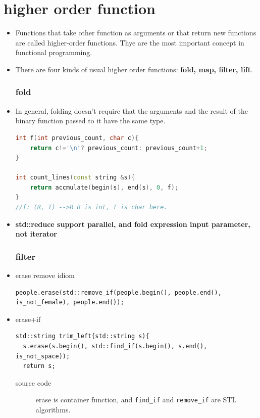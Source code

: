 \documentclass[a4paper,11pt,twoside]{book}
\begin{document}
\section{higher order function}
\begin{itemize}
	\item Functions that take other function as arguments or that return new functions are called higher-order functions. Thye are the most important concept in functional programming.
	\item There are four kinds of usual higher order functions: \textbf{fold, map, filter, lift}.
	
\subsubsection{fold}
	
	\item In general, folding doesn't require that the arguments and the result of the binary function passed to it have the same type. 
	
\begin{lstlisting}[frame=single, language=c++]
int f(int previous_count, char c){
   	return c!='\n'? previous_count: previous_count+1;
}
   
int count_lines(const string &s){
   	return accmulate(begin(s), end(s), 0, f);
}
//f: (R, T) -->R R is int, T is char here.
\end{lstlisting} 
	
	\item \textbf{std::reduce support parallel, and fold expression input parameter, not iterator}
	
\subsubsection{filter}
	\item erase remove idiom
\begin{lstlisting}
people.erase(std::remove_if(people.begin(), people.end(), is_not_female), people.end());
\end{lstlisting}

	\item erase+if
\begin{lstlisting}
std::string trim_left{std::string s){
  s.erase(s.begin(), std::find_if(s.begin(), s.end(), is_not_space));
  return s;
\end{lstlisting}
\begin{description}
		\item[source code] erase is container function, and \texttt{find\_if} and \texttt{remove\_if} are STL algorithms. 
\end{description}


\end{itemize}
\end{document}
